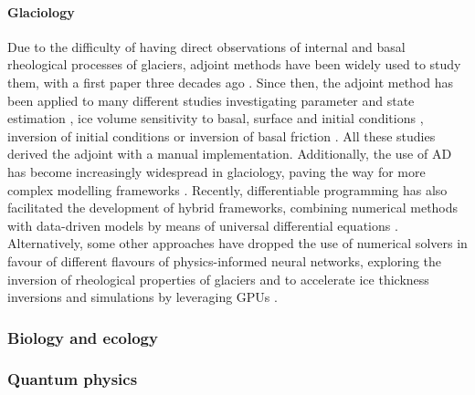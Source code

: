 \paragraph{Glaciology}

Due to the difficulty of having direct observations of internal and basal rheological processes of glaciers, adjoint methods have been widely used to study them, with a first paper three decades ago \cite{macayeal1992basal}. 
Since then, the adjoint method has been applied to many different studies investigating parameter and state estimation \cite{goldberg2013parameter}, ice volume sensitivity to basal, surface and initial conditions \cite{heimbach2009greenland}, inversion of initial conditions \cite{mosbeux2016comparison} or inversion of basal friction \cite{morlighem2013inversion}.
All these studies derived the adjoint with a manual implementation. 
Additionally, the use of AD has become increasingly widespread in glaciology, paving the way for more complex modelling frameworks \cite{hascoet2018source, logan2020sicopolis}. 
Recently, differentiable programming has also facilitated the development of hybrid frameworks, combining numerical methods with data-driven models by means of universal differential equations \cite{BolibarSapienza_UDEs}. 
Alternatively, some other approaches have dropped the use of numerical solvers in favour of different flavours of physics-informed neural networks, exploring the inversion of rheological properties of glaciers \cite{wang2022discovering} and to accelerate ice thickness inversions and simulations by leveraging GPUs \cite{Jouvet_Cordonnier_Kim_Lüthi_Vieli_Aschwanden_2021, jouvet2023inversion}. 


\subsubsection{Biology and ecology}


\subsubsection{Quantum physics}

